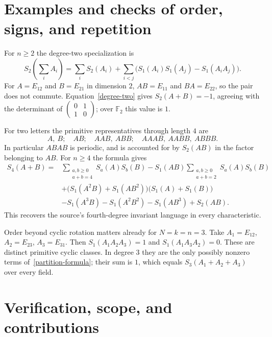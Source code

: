 \documentclass[11pt]{article}
\begin{document}
\section{Examples and checks of order, signs, and repetition}
For $n\geq2$ the degree-two specialization is
\begin{equation}\label{degree-two}
 S_2\left(\sum_iA_i\right)
   =\sum_i S_2(A_i)+\sum_{i<j}
          \bigl(S_1(A_i)S_1(A_j)-S_1(A_iA_j)\bigr).
\end{equation}
For $A=E_{12}$ and $B=E_{21}$ in dimension $2$, $AB=E_{11}$ and
$BA=E_{22}$, so the pair does not commute. Equation~\eqref{degree-two}
gives $S_2(A+B)=-1$, agreeing with the determinant of
$\left(\begin{smallmatrix}0&1\\1&0\end{smallmatrix}\right)$;
over $\mathbb F_2$ this value is $1$.

For two letters the primitive representatives through length $4$ are
\[
 A,\ B;\quad AB;\quad AAB,\ ABB;\quad AAAB,\ AABB,\ ABBB.
\]
In particular $ABAB$ is periodic, and is accounted for by $S_2(AB)$
in the factor belonging to $AB$. For $n\geq4$ the formula gives
\begin{equation}\label{degree-four}
\begin{aligned}
 S_4(A+B)={}&\sum_{\substack{a,b\geq0\\a+b=4}}S_a(A)S_b(B)
       -S_1(AB)\sum_{\substack{a,b\geq0\\a+b=2}}S_a(A)S_b(B)\\
 &+\bigl(S_1(A^2B)+S_1(AB^2)\bigr)\bigl(S_1(A)+S_1(B)\bigr)\\
 &-S_1(A^3B)-S_1(A^2B^2)-S_1(AB^3)+S_2(AB).
\end{aligned}
\end{equation}
This recovers the source's fourth-degree invariant language in every
characteristic.

Order beyond cyclic rotation matters already for $N=k=n=3$.
Take $A_1=E_{12}$, $A_2=E_{23}$, $A_3=E_{31}$.
Then $S_1(A_1A_2A_3)=1$ and $S_1(A_1A_3A_2)=0$.
These are distinct primitive cyclic classes. In degree $3$ they are
the only possibly nonzero terms of~\eqref{partition-formula}; their sum
is $1$, which equals $S_3(A_1+A_2+A_3)$ over every field.

\section{Verification, scope, and contributions}
\end{document}
